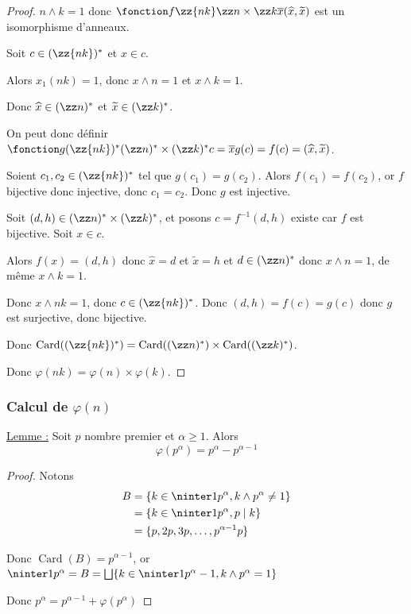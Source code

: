 \begin{proof}
    $n \wedge k = 1$ donc $\fonction f {\zz {nk}}{\zz n \times \zz k}{\overline x}{(\widehat x, \widetilde x)}$ est un isomorphisme d'anneaux.

    Soit $c \in (\zz{nk})^*$ et $x \in c$. 

    Alors $x_1(nk) = 1$, donc $x \wedge n = 1$ et $x \wedge k = 1$.

    Donc $\widehat x  \in (\zz n)^*$ et $\widetilde x \in (\zz k)^*$.

    On peut donc définir $\fonction g {(\zz {nk})^*}{(\zz n)^* \times (\zz k)^*}{c = \overline x}{g(c) = f(c) = (\widehat x, \widetilde x)}$.

    Soient $c_1, c_2 \in (\zz{nk})^*$ tel que $g(c_1) = g(c_2)$. Alors 
    $f(c_1) = f(c_2)$, or $f$ bijective donc injective, donc $c_1 = c_2$. Donc $g$ est injective.

    Soit $(d, h) \in (\zz n)^* \times (\zz k)^*$, et posons $c = f^{-1}(d, h)$ existe car $f$ 
    est bijective. Soit $x \in c$.

    Alors $f(x) = (d, h)$ donc $\widehat x = d $ et $\widetilde x = h$ et 
    $d \in (\zz n)^*$ donc $x \wedge n = 1$, de même $x \wedge k = 1$.

    Donc $x \wedge nk = 1$, donc $c \in (\zz {nk})^*$. Donc $(d, h) = f(c) = g(c)$ donc 
    $g$ est surjective, donc bijective.

    Donc $\operatorname{Card}((\zz {nk})^*) = \operatorname{Card}((\zz n)^*) \times \operatorname{Card}((\zz k)^*)$.

    Donc $\varphi(nk) = \varphi(n) \times \varphi(k)$.
\end{proof}

\subsubsection{Calcul de $\varphi(n)$}

\uline{Lemme :} Soit $p$ nombre premier et $\alpha \geqslant 1$. Alors 
\[
    \varphi(p^\alpha) = p^\alpha - p^{\alpha - 1} 
\]

\begin{proof}
    Notons 
    \begin{align*}
        B & = \{k \in \ninter 1 {p^\alpha}, k \wedge p^\alpha \neq 1\} \\
        & = \{k \in \ninter 1 {p^\alpha}, p \mid k\} \\
        & = \{p, 2p, 3p, \ldots, p^{\alpha - 1} p\} \\
    \end{align*} 

    Donc $\operatorname{Card}(B) = p^{\alpha - 1}$, or $\ninter 1 {p^\alpha} = B = \bigsqcup \{k \in \ninter 1 {p^\alpha - 1}, k \wedge p^\alpha = 1\}$
    
    Donc $p^\alpha = p^{\alpha - 1} + \varphi(p^\alpha)$
\end{proof}



